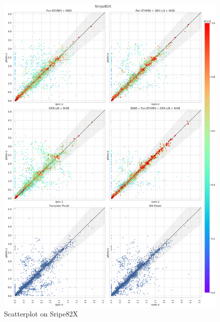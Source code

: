 \documentclass[fleqn,usenatbib]{mnras}
\begin{document}
\begin{figure}[ht]
    \centering
    \includegraphics[width=0.9\linewidth]{images/scatterplots-stripe82x.png}
    \caption{Scatterplot on Sripe82X}
    \label{fig:s82a}
\end{figure}
\end{document}
